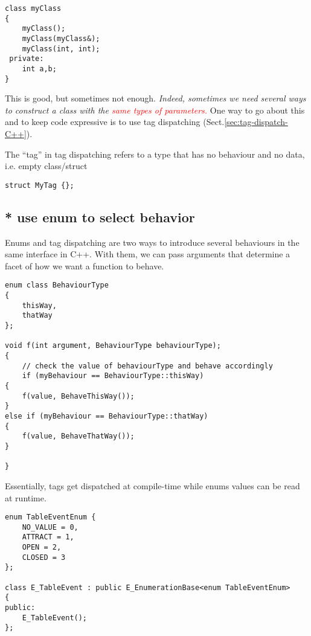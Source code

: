\begin{verbatim}
class myClass 
{
    myClass();
    myClass(myClass&);
    myClass(int, int);
 private:
    int a,b;
}
\end{verbatim}

This is good, but sometimes not enough. {\it Indeed, sometimes we need several
ways to construct a class with the \textcolor{red}{same types of parameters.}}
One way to go about this and to keep code expressive is to use tag dispatching
(Sect.\ref{sec:tag-dispatch-C++}).

The “tag” in tag dispatching refers to a type that has no behaviour and no data, i.e. empty class/struct
\begin{verbatim}
struct MyTag {};
\end{verbatim}

\subsection{* use enum to select behavior}


Enums and tag dispatching are two ways to introduce several behaviours in the
same interface in C++. With them, we can pass arguments that determine a facet
of how we want a function to behave.

\begin{verbatim}
enum class BehaviourType
{
    thisWay,
    thatWay
};
 
void f(int argument, BehaviourType behaviourType);
{
    // check the value of behaviourType and behave accordingly
    if (myBehaviour == BehaviourType::thisWay)
{
    f(value, BehaveThisWay());
}
else if (myBehaviour == BehaviourType::thatWay)
{
    f(value, BehaveThatWay());
}

}
\end{verbatim}


Essentially, tags get dispatched at compile-time while enums values can be read at runtime.


\begin{lstlisting}
enum TableEventEnum {
    NO_VALUE = 0,
    ATTRACT = 1,
    OPEN = 2,
    CLOSED = 3
};

class E_TableEvent : public E_EnumerationBase<enum TableEventEnum>
{
public:
    E_TableEvent();
};
\end{lstlisting}


